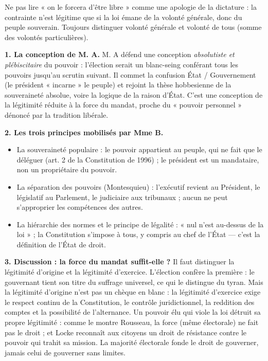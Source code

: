 \documentclass[11pt]{article}
\newcommand{\cle}[1]{{\popxbold\color{popdark}#1}}
\begin{document}
\begin{attention}
Ne pas lire « on le forcera d'être libre » comme une apologie de la dictature : la contrainte n'est légitime que si la loi émane de la volonté générale, donc du peuple souverain. Toujours distinguer volonté générale et volonté de tous (somme des volontés particulières).
\end{attention}

\begin{corrige}
\textbf{1. La conception de M. A.} M. A défend une conception \emph{absolutiste et plébiscitaire} du pouvoir : l'élection serait un blanc-seing conférant tous les pouvoirs jusqu'au scrutin suivant. Il commet la confusion \cle{État / Gouvernement} (le président « incarne » le peuple) et rejoint la thèse hobbesienne de la souveraineté absolue, voire la logique de la raison d'État. C'est une conception de la légitimité réduite à la force du mandat, proche du « pouvoir personnel » dénoncé par la tradition libérale.

\textbf{2. Les trois principes mobilisés par Mme B.}
\begin{itemize}
    \item La \cle{souveraineté populaire} : le pouvoir appartient au peuple, qui ne fait que le déléguer (art. 2 de la Constitution de 1996) ; le président est un mandataire, non un propriétaire du pouvoir.
    \item La \cle{séparation des pouvoirs} (Montesquieu) : l'exécutif revient au Président, le législatif au Parlement, le judiciaire aux tribunaux ; aucun ne peut s'approprier les compétences des autres.
    \item La \cle{hiérarchie des normes} et le principe de légalité : « nul n'est au-dessus de la loi » ; la Constitution s'impose à tous, y compris au chef de l'État — c'est la définition de l'\cle{État de droit}.
\end{itemize}

\textbf{3. Discussion : la force du mandat suffit-elle ?} Il faut distinguer la \cle{légitimité d'origine} et la \cle{légitimité d'exercice}. L'élection confère la première : le gouvernant tient son titre du suffrage universel, ce qui le distingue du tyran. Mais la légitimité d'origine n'est pas un chèque en blanc : la légitimité d'exercice exige le respect continu de la Constitution, le contrôle juridictionnel, la reddition des comptes et la possibilité de l'alternance. Un pouvoir élu qui viole la loi détruit sa propre légitimité : comme le montre Rousseau, la force (même électorale) ne fait pas le droit ; et Locke reconnaît aux citoyens un droit de résistance contre le pouvoir qui trahit sa mission. La majorité électorale fonde le droit de gouverner, jamais celui de gouverner sans limites.


\end{corrige}
\end{document}

